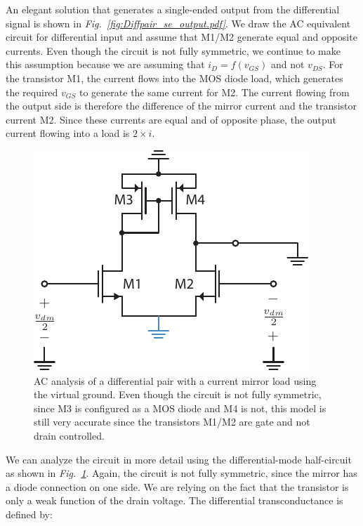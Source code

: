 An elegant solution that generates a single-ended output from the differential signal is shown in \emph{Fig.~\ref{fig:Diffpair_se_output.pdf}}.  We draw the AC equivalent circuit for differential input and assume that M1/M2 generate equal and opposite currents.  Even though the circuit is not fully symmetric, we continue to make this assumption because we are assuming that $i_D = f(v_{GS})$ and not $v_{DS}$.  For the transistor M1, the current flows into the MOS diode load, which generates the required $v_{GS}$ to generate the same current for M2.  The current flowing from the output side is therefore the difference of the mirror current and the transistor current M2.  Since these currents are equal and of opposite phase, the output current flowing into a load is $2\times i$. 
\begin{figure}[tb]
\centering
\includegraphics[scale=1]{Diffpair_se_ac_gm.pdf} 
\caption{AC analysis of a differential pair with a current mirror load using the virtual ground.  Even though the circuit is not fully symmetric, since M3 is configured as a MOS diode and M4 is not, this model is still very accurate since the transistors M1/M2 are gate and not drain controlled.} \label{fig:Diffpair_se_ac_gm.pdf}
\end{figure}
We can analyze the circuit in more detail using the differential-mode half-circuit as shown in \emph{Fig.~\ref{fig:Diffpair_se_ac_gm.pdf}}.  Again, the circuit is not fully symmetric, since the mirror has a diode connection on one side.  We are relying on the fact that the transistor is only a weak function of the drain voltage.  The differential transconductance is defined by:
